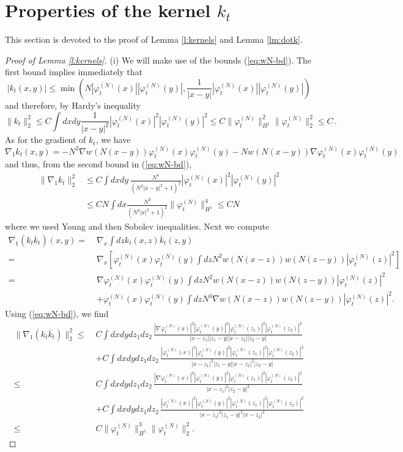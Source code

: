 \documentclass[11pt,a4paper]{article}
\newcommand{\done}{}
\newcommand{\ph}{\varphi_t^{(N)}}	%
\begin{document}
\section{Properties of the kernel $k_t$}
\label{sec:kernels}


This section is devoted to the proof of Lemma \ref{l:kernels} and Lemma \ref{lm:dotk}.

\begin{proof}[Proof of Lemma \ref{l:kernels}]
(i) We will make use of the bounds (\ref{eq:wN-bd}). The first bound implies immediately that
\begin{equation}\label{eq:k-pt} |k_t (x,y)| \leq \min \left(N |\ph (x)| |\ph (y)| , \frac{1}{|x-y|} |\ph (x)| |\ph (y)| \right) \end{equation}
and therefore, by Hardy's inequality 
\[ \| k_t \|_2^2 \leq C \int dx dy \frac{1}{|x-y|^2} |\ph (x)|^2 |\ph (y)|^2 \leq C \| \ph \|_{H^1}^2 \| \ph \|_2^2  \leq C \, . \]
As for the gradient of $k_t$, we have
\[ \nabla_1 k_t (x,y) = -N^2 \nabla w (N (x-y)) \ph (x) \ph (y) - N w (N (x-y)) \nabla \ph (x) \ph (y) \]
and thus, from the second bound in (\ref{eq:wN-bd}), 
\[ \begin{split} \| \nabla_1 k_t \|_2^2 & \leq C \int dx dy \, \frac{N^4}{(N^2 |x-y|^2 + 1)^2}  |\ph (x)|^2 |\ph (y)|^2  \\ & \leq C N \int dx \frac{N^3}{(N^2 |x|^2 + 1)^2} \| \ph \|_{H^1}^4 \leq C N \end{split} \]
where we used Young and then Sobolev inequalities\done{}. Next we compute
\[ \begin{split} 
\nabla_1(k_t \overline{k}_t) (x,y) =\; & \nabla_x \int dz k_t (x,z) \overline{k}_t (z,y) \\ 
= \; &\nabla_x \left[  \ph (x) \ph (y) \int dz N^2 w (N(x-z)) w(N(z-y)) |\ph (z)|^2 \right] \\
= \; &\nabla \ph (x) \ph (y) \int dz N^2 w (N(x-z)) w(N(z-y)) |\ph (z)|^2\\ &+ \ph (x) \ph (y) \int dz N^3 \nabla w (N (x-z)) w(N(z-y)) |\ph (z)|^2. \end{split} \] 
Using (\ref{eq:wN-bd}), we find
\[ \begin{split}  \| \nabla_1 (k_t \overline{k}_t) \|_2^2 \leq \; &C \int dx dy dz_1 dz_2 \, \frac{|\nabla \ph (x)|^2 |\ph (y)|^2 |\ph(z_1)|^2 |\ph (z_2)|^2}{|x-z_1||z_1 -y||x-z_2||z_2 -y|} \\
&+C \int dx dy dz_1 dz_2 \, \frac{|\ph (x)|^2 |\ph (y)|^2 |\ph(z_1)|^2 |\ph (z_2)|^2}{|x-z_1|^2 |z_1 -y| |x-z_2|^2 |z_2 -y|} \\  \leq \; &C \int dx dy dz_1 dz_2 \, \frac{|\nabla \ph (x)|^2 |\ph (y)|^2 |\ph(z_1)|^2 |\ph (z_2)|^2}{|x-z_1|^2 |z_2 -y|^2} \\
&+C \int dx dy dz_1 dz_2 \, \frac{|\ph (x)|^2 |\ph (y)|^2 |\ph(z_1)|^2 |\ph (z_2)|^2}{|x-z_1|^2 |z_1 - y|^2 |x-z_2|^2} \\ \leq \; &C \| \ph \|_{H^1}^3 \| \ph \|^2_2. \end{split}\]


\end{proof}
\end{document}
